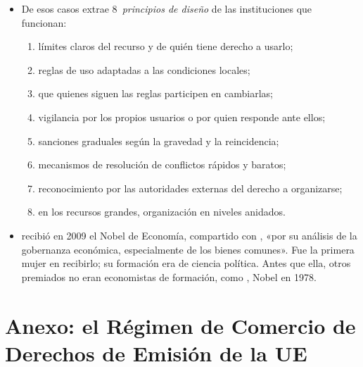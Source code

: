 \documentclass[11pt]{article}
\begin{document}
\begin{itemize}
\begin{itemize}
  \end{itemize}
\item De esos casos extrae 8~\emph{principios de diseño} de las instituciones que funcionan\nocite{Ostrom1990Governing}:
  \begin{enumerate}
  \item límites claros del recurso y de quién tiene derecho a usarlo;
  \item reglas de uso adaptadas a las condiciones locales;
  \item que quienes siguen las reglas participen en cambiarlas;
  \item vigilancia por los propios usuarios o por quien responde ante ellos;
  \item sanciones graduales según la gravedad y la reincidencia;
  \item mecanismos de resolución de conflictos rápidos y baratos;
  \item reconocimiento por las autoridades externas del derecho a organizarse;
  \item en los recursos grandes, organización en niveles anidados.
  \end{enumerate}
\item {} recibió en 2009 el Nobel de Economía, compartido con , «por su análisis de la gobernanza económica, especialmente de los bienes comunes»\nocite{Nobel2009OstromWilliamson}. Fue la primera mujer en recibirlo; su formación era de ciencia política. Antes que ella, otros premiados no eran economistas de formación, como , Nobel en 1978\nocite{Nobel1978Simon}.
\end{itemize}

\section{Anexo: el Régimen de Comercio\cortetitulo{} de Derechos de Emisión de la UE}\label{anexo:rcde}
\end{document}
